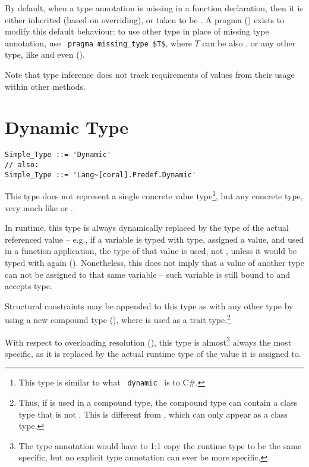 By default, when a type annotation is missing in a function declaration, then it is either inherited (based on overriding), or taken to be . A pragma () exists to modify this default behaviour: to use other type in place of missing type annotation, use ~\lstinline!pragma missing_type $T$!, where $T$ can be also , or any other type, like  and even  (). 

Note that  type inference does not track requirements of values from their usage within other methods.






\section{Dynamic Type}
\label{sec:dynamic-type}

\syntax\begin{lstlisting}[morekeywords={Dynamic}]
Simple_Type ::= 'Dynamic'
// also:
Simple_Type ::= 'Lang~[coral].Predef.Dynamic'
\end{lstlisting}

This type does not represent a single concrete value type\footnote{This type is similar to what ~\lstinline[language={[Sharp]C}]!dynamic!~ is to C\#.}, but any concrete type, very much like  or . 

In runtime, this type is always dynamically replaced by the type of the actual referenced value -- e.g., if a variable is typed with  type, assigned a value, and used in a function application, the type of that value is used, not , unless it would be typed with  again (). Nonetheless, this does not imply that a value of another type can not be assigned to that same variable -- such variable is still bound to  and accepts  type. 

Structural constraints may be appended to this type as with any other type by using a new compound type (), where  is used as a trait type.\footnote{Thus, if  is used in a compound type, the compound type can contain a class type that is not . This is different from , which can only appear as a class type.}

With respect to overloading resolution (), this type is almost\footnote{The type annotation would have to 1:1 copy the runtime type to be the same specific, but no explicit type annotation can ever be more specific.} always the most specific, as it is replaced by the actual runtime type of the value it is assigned to. 

